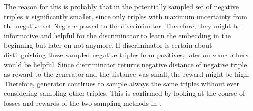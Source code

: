 The reason for this is probably that in \usmax the potentially sampled set of negative triples is significantly smaller, since only triples with maximum uncertainty from the negative set Neg are passed to the discriminator.
Therefore, they might be informative and helpful for the discriminator to learn the embedding in the beginning but later on not anymore.
If discriminator is certain about distinguishing these sampled negative triples from positives, later on some others would be helpful.
Since discriminator returns negative distance of negative triple as reward to the generator and the distance was small, the reward might be high.
Therefore, generator continues to sample always the same triples without ever considering sampling other triples.
This is confirmed by looking at the course of losses and rewards of the two sampling methods in .
